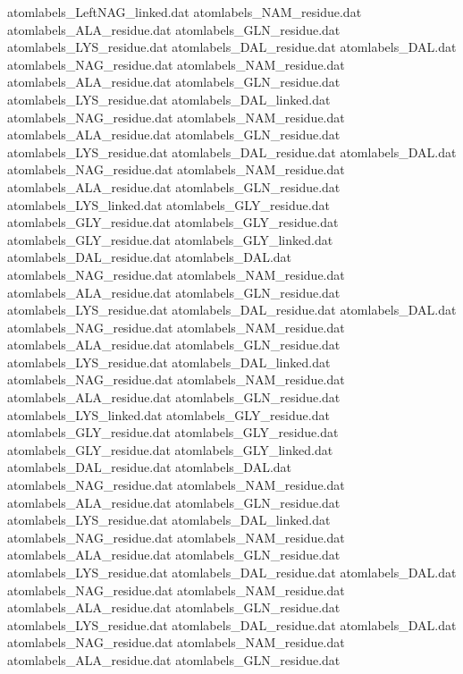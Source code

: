 atomlabels_LeftNAG_linked.dat   
atomlabels_NAM_residue.dat      
atomlabels_ALA_residue.dat      
atomlabels_GLN_residue.dat      
atomlabels_LYS_residue.dat      
atomlabels_DAL_residue.dat      
atomlabels_DAL.dat              
atomlabels_NAG_residue.dat      
atomlabels_NAM_residue.dat      
atomlabels_ALA_residue.dat      
atomlabels_GLN_residue.dat      
atomlabels_LYS_residue.dat      
atomlabels_DAL_linked.dat       
atomlabels_NAG_residue.dat      
atomlabels_NAM_residue.dat      
atomlabels_ALA_residue.dat      
atomlabels_GLN_residue.dat      
atomlabels_LYS_residue.dat      
atomlabels_DAL_residue.dat      
atomlabels_DAL.dat              
atomlabels_NAG_residue.dat      
atomlabels_NAM_residue.dat      
atomlabels_ALA_residue.dat      
atomlabels_GLN_residue.dat      
atomlabels_LYS_linked.dat       
atomlabels_GLY_residue.dat
atomlabels_GLY_residue.dat
atomlabels_GLY_residue.dat
atomlabels_GLY_residue.dat
atomlabels_GLY_linked.dat
atomlabels_DAL_residue.dat      
atomlabels_DAL.dat              
atomlabels_NAG_residue.dat      
atomlabels_NAM_residue.dat      
atomlabels_ALA_residue.dat      
atomlabels_GLN_residue.dat      
atomlabels_LYS_residue.dat      
atomlabels_DAL_residue.dat      
atomlabels_DAL.dat              
atomlabels_NAG_residue.dat      
atomlabels_NAM_residue.dat      
atomlabels_ALA_residue.dat      
atomlabels_GLN_residue.dat      
atomlabels_LYS_residue.dat      
atomlabels_DAL_linked.dat       
atomlabels_NAG_residue.dat      
atomlabels_NAM_residue.dat      
atomlabels_ALA_residue.dat      
atomlabels_GLN_residue.dat      
atomlabels_LYS_linked.dat       
atomlabels_GLY_residue.dat
atomlabels_GLY_residue.dat
atomlabels_GLY_residue.dat
atomlabels_GLY_residue.dat
atomlabels_GLY_linked.dat
atomlabels_DAL_residue.dat      
atomlabels_DAL.dat              
atomlabels_NAG_residue.dat      
atomlabels_NAM_residue.dat      
atomlabels_ALA_residue.dat      
atomlabels_GLN_residue.dat      
atomlabels_LYS_residue.dat      
atomlabels_DAL_linked.dat       
atomlabels_NAG_residue.dat      
atomlabels_NAM_residue.dat      
atomlabels_ALA_residue.dat      
atomlabels_GLN_residue.dat      
atomlabels_LYS_residue.dat      
atomlabels_DAL_residue.dat      
atomlabels_DAL.dat              
atomlabels_NAG_residue.dat      
atomlabels_NAM_residue.dat      
atomlabels_ALA_residue.dat      
atomlabels_GLN_residue.dat      
atomlabels_LYS_residue.dat      
atomlabels_DAL_residue.dat      
atomlabels_DAL.dat              
atomlabels_NAG_residue.dat      
atomlabels_NAM_residue.dat      
atomlabels_ALA_residue.dat      
atomlabels_GLN_residue.dat      
